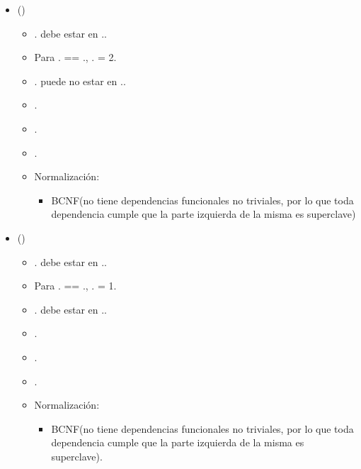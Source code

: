 \begin{itemize}
    \item {}()
          \begin{itemize}
              \item {}. debe estar en
                    ..
              \item Para . == .,
                    . = 2.
              \item {}. puede no estar en
                    ..
              \item {}.
              \item {}.
              \item \FK{$\emptyset$}.
              \item Normalización:
                    \begin{itemize}
                        \item BCNF(no tiene dependencias funcionales no triviales, por lo que toda
                              dependencia cumple que la parte izquierda de la misma es superclave)
                    \end{itemize}
          \end{itemize}

    \item {}()
          \begin{itemize}
              \item {}. debe estar en
                    ..
              \item Para . == .,
                    . = 1.
              \item {}. debe estar en
                    ..
              \item {}.
              \item {}.
              \item {}.
              \item Normalización:
                    \begin{itemize}
                        \item BCNF(no tiene dependencias funcionales no triviales, por lo que toda
                              dependencia cumple que la parte izquierda de la misma es superclave).
                    \end{itemize}
          \end{itemize}


\end{itemize}
